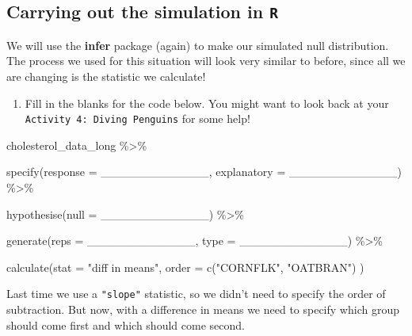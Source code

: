 \documentclass[
  letterpaper,
  DIV=11,
  numbers=noendperiod]{scrartcl}
\newenvironment{Shaded}{\begin{snugshade}}{\end{snugshade}}
\newcommand{\AttributeTok}[1]{\textcolor[rgb]{0.40,0.45,0.13}{#1}}
\newcommand{\FunctionTok}[1]{\textcolor[rgb]{0.28,0.35,0.67}{#1}}
\newcommand{\NormalTok}[1]{\textcolor[rgb]{0.00,0.23,0.31}{#1}}
\newcommand{\SpecialCharTok}[1]{\textcolor[rgb]{0.37,0.37,0.37}{#1}}
\newcommand{\StringTok}[1]{\textcolor[rgb]{0.13,0.47,0.30}{#1}}
\providecommand{\tightlist}{%
  \setlength{\itemsep}{0pt}\setlength{\parskip}{0pt}}\usepackage{longtable,booktabs,array}
\begin{document}
\hypertarget{carrying-out-the-simulation-in-r}{%
\subsection{\texorpdfstring{Carrying out the simulation in
\texttt{R}}{Carrying out the simulation in R}}\label{carrying-out-the-simulation-in-r}}

We will use the \textbf{infer} package (again) to make our simulated
null distribution. The process we used for this situation will look very
similar to before, since all we are changing is the statistic we
calculate!

\begin{enumerate}
\def\labelenumi{\arabic{enumi}.}
\setcounter{enumi}{21}
\tightlist
\item
  Fill in the blanks for the code below. You might want to look back at
  your \texttt{Activity\ 4:\ Diving\ Penguins} for some help!
\end{enumerate}

\begin{Shaded}
\begin{Highlighting}[]
\NormalTok{cholesterol\_data\_long }\SpecialCharTok{\%\textgreater{}\%} 
  
  \FunctionTok{specify}\NormalTok{(}\AttributeTok{response =}\NormalTok{ \_\_\_\_\_\_\_\_\_\_\_\_\_, }\AttributeTok{explanatory =}\NormalTok{ \_\_\_\_\_\_\_\_\_\_\_\_\_) }\SpecialCharTok{\%\textgreater{}\%} 
  
  \FunctionTok{hypothesise}\NormalTok{(}\AttributeTok{null =}\NormalTok{ \_\_\_\_\_\_\_\_\_\_\_\_\_) }\SpecialCharTok{\%\textgreater{}\%} 
  
  \FunctionTok{generate}\NormalTok{(}\AttributeTok{reps =}\NormalTok{ \_\_\_\_\_\_\_\_\_\_\_\_\_, }\AttributeTok{type =}\NormalTok{ \_\_\_\_\_\_\_\_\_\_\_\_\_) }\SpecialCharTok{\%\textgreater{}\%} 
  
  \FunctionTok{calculate}\NormalTok{(}\AttributeTok{stat =} \StringTok{"diff in means"}\NormalTok{, }
            \AttributeTok{order =} \FunctionTok{c}\NormalTok{(}\StringTok{"CORNFLK"}\NormalTok{, }\StringTok{"OATBRAN"}\NormalTok{)}
\NormalTok{            )}
\end{Highlighting}
\end{Shaded}

\vspace{0.2in}

Last time we use a \texttt{"slope"} statistic, so we didn't need to
specify the order of subtraction. But now, with a difference in means we
need to specify which group should come first and which should come
second.
\end{document}
